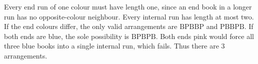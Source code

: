 Every end run of one colour must have length one, since an end book in a longer run has no opposite-colour neighbour. Every internal run has length at most two. If the end colours differ, the only valid arrangements are $\mathrm{BPBBP}$ and $\mathrm{PBBPB}$. If both ends are blue, the sole possibility is $\mathrm{BPBPB}$. Both ends pink would force all three blue books into a single internal run, which fails. Thus there are $\boxed3$ arrangements.

